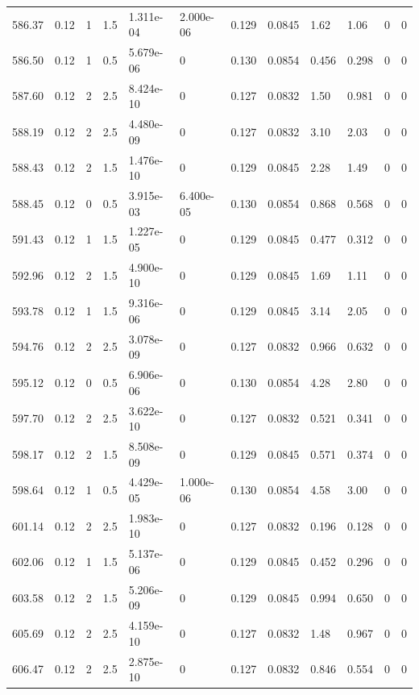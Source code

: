 \documentclass[preview]{standalone}
\begin{document}
{{{{{{{{{{\begin{tabular}{L{1.2cm}C{1.2cm} C{0.3cm}C{0.5cm} C{1.4cm}C{1.4cm} C{1.4cm}C{1.4cm} C{1.6cm}C{1.6cm} C{1.6cm}C{1.6cm}}
  586.37  &  0.12  & 1     & 1.5 &  1.311e-04  & 2.000e-06  &  0.129&   0.0845& 1.62 & 1.06   &  0 & 0  \\ 
  586.50  &  0.12  & 1     & 0.5 &  5.679e-06  & 0  &  0.130&   0.0854& 0.456 & 0.298   &  0 & 0  \\ 
  587.60  &  0.12  & 2     & 2.5 &  8.424e-10  & 0  &  0.127&   0.0832& 1.50 & 0.981   &  0 & 0  \\ 
  588.19  &  0.12  & 2     & 2.5 &  4.480e-09  & 0  &  0.127&   0.0832& 3.10 & 2.03   &  0 & 0  \\ 
  588.43  &  0.12  & 2     & 1.5 &  1.476e-10  & 0  &  0.129&   0.0845& 2.28 & 1.49   &  0 & 0  \\ 
  588.45  &  0.12  & 0     & 0.5 &  3.915e-03  & 6.400e-05  &  0.130&   0.0854& 0.868 & 0.568   &  0 & 0  \\ 
  591.43  &  0.12  & 1     & 1.5 &  1.227e-05  & 0  &  0.129&   0.0845& 0.477 & 0.312   &  0 & 0  \\ 
  592.96  &  0.12  & 2     & 1.5 &  4.900e-10  & 0  &  0.129&   0.0845& 1.69 & 1.11   &  0 & 0  \\ 
  593.78  &  0.12  & 1     & 1.5 &  9.316e-06  & 0  &  0.129&   0.0845& 3.14 & 2.05   &  0 & 0  \\ 
  594.76  &  0.12  & 2     & 2.5 &  3.078e-09  & 0  &  0.127&   0.0832& 0.966 & 0.632   &  0 & 0  \\ 
  595.12  &  0.12  & 0     & 0.5 &  6.906e-06  & 0  &  0.130&   0.0854& 4.28 & 2.80   &  0 & 0  \\ 
  597.70  &  0.12  & 2     & 2.5 &  3.622e-10  & 0  &  0.127&   0.0832& 0.521 & 0.341   &  0 & 0  \\ 
  598.17  &  0.12  & 2     & 1.5 &  8.508e-09  & 0  &  0.129&   0.0845& 0.571 & 0.374   &  0 & 0  \\ 
  598.64  &  0.12  & 1     & 0.5 &  4.429e-05  & 1.000e-06  &  0.130&   0.0854& 4.58 & 3.00   &  0 & 0  \\ 
  601.14  &  0.12  & 2     & 2.5 &  1.983e-10  & 0  &  0.127&   0.0832& 0.196 & 0.128   &  0 & 0  \\ 
  602.06  &  0.12  & 1     & 1.5 &  5.137e-06  & 0  &  0.129&   0.0845& 0.452 & 0.296   &  0 & 0  \\ 
  603.58  &  0.12  & 2     & 1.5 &  5.206e-09  & 0  &  0.129&   0.0845& 0.994 & 0.650   &  0 & 0  \\ 
  605.69  &  0.12  & 2     & 2.5 &  4.159e-10  & 0  &  0.127&   0.0832& 1.48 & 0.967   &  0 & 0  \\ 
  606.47  &  0.12  & 2     & 2.5 &  2.875e-10  & 0  &  0.127&   0.0832& 0.846 & 0.554   &  0 & 0  \\ 

\end{tabular}}}}}}}}}}}
\end{document}
